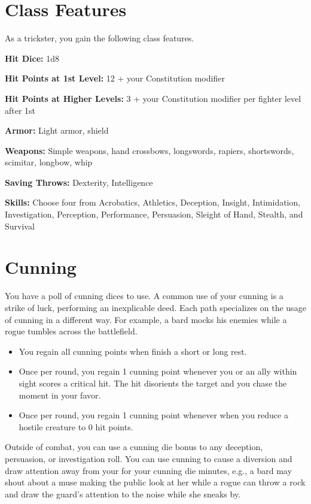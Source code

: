 \begin{multicols*}{2}

\section*{Class Features} 

As a trickster, you gain the following class features.

\textbf{Hit Dice:} 1d8

\textbf{Hit Points at 1st Level:} 12 + your Constitution modifier

\textbf{Hit Points at Higher Levels:} 3 + your Constitution modifier per fighter level after 1st


\textbf{Armor:} Light armor, shield

\textbf{Weapons:} Simple weapons, hand crossbows, longswords, rapiers, shortswords, scimitar, longbow, whip

\textbf{Saving Throws:} Dexterity, Intelligence

\textbf{Skills:} Choose four from Acrobatics, Athletics, Deception, Insight, Intimidation, Investigation, Perception, Performance, Persuasion, Sleight of Hand, Stealth, and Survival
    
\section*{Cunning} 

You have a poll of cunning dices to use. A common use of your cunning is a strike of luck, performing an inexplicable deed. Each path specializes on the usage of cunning in a different way. For example, a bard mocks his enemies while a rogue tumbles across the battlefield.



\begin{itemize}
    \item You regain all cunning points when finish a short or long rest.
    \item Once per round, you regain 1 cunning point whenever you or an ally within sight scores a critical hit. The hit disorients the target and you chase the moment in your favor.
    \item Once per round, you regain 1 cunning point whenever when you reduce a hostile creature to 0 hit points.
\end{itemize}

Outside of combat, you can use a cunning die bonus to any deception, persuasion, or investigation roll. You can use cunning to cause a diversion and draw attention away from your for your cunning die minutes, e.g., a bard may shout about a muse making the public look at her while a rogue can throw a rock and draw the guard's attention to the noise while she sneaks by.


\end{multicols*}
